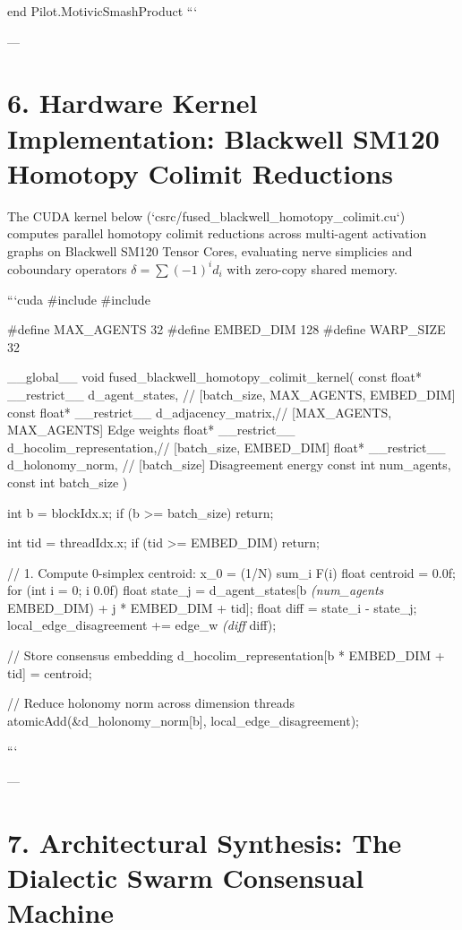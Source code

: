 \documentclass[11pt,twoside,openright]{amsbook}
\begin{document}
{{end Pilot.MotivicSmashProduct
```

---

\section{6. Hardware Kernel Implementation: Blackwell SM120 Homotopy Colimit Reductions}

The CUDA kernel below (`csrc/fused_blackwell_homotopy_colimit.cu`) computes parallel homotopy colimit reductions across multi-agent activation graphs on Blackwell SM120 Tensor Cores, evaluating nerve simplicies and coboundary operators $\delta = \sum (-1)^i d_i$ with zero-copy shared memory.

```cuda
#include 
#include 

#define MAX_AGENTS 32
#define EMBED_DIM 128
#define WARP_SIZE 32

__global__ void fused_blackwell_homotopy_colimit_kernel(
    const float* __restrict__ d_agent_states,    // [batch_size, MAX_AGENTS, EMBED_DIM]
    const float* __restrict__ d_adjacency_matrix,// [MAX_AGENTS, MAX_AGENTS] Edge weights
    float* __restrict__ d_hocolim_representation,// [batch_size, EMBED_DIM]
    float* __restrict__ d_holonomy_norm,         // [batch_size] Disagreement energy
    const int num_agents,
    const int batch_size
) {
    int b = blockIdx.x;
    if (b >= batch_size) return;

    int tid = threadIdx.x;
    if (tid >= EMBED_DIM) return;

    // 1. Compute 0-simplex centroid: x_0 = (1/N) sum_i F(i)
    float centroid = 0.0f;
    for (int i = 0; i  0.0f) {
                float state_j = d_agent_states[b \textit{ (num_agents } EMBED_DIM) + j * EMBED_DIM + tid];
                float diff = state_i - state_j;
                local_edge_disagreement += edge_w \textit{ (diff } diff);
            }
        }
    }

    // Store consensus embedding
    d_hocolim_representation[b * EMBED_DIM + tid] = centroid;

    // Reduce holonomy norm across dimension threads
    atomicAdd(&d_holonomy_norm[b], local_edge_disagreement);
}
```

---

\section{7. Architectural Synthesis: The Dialectic Swarm Consensual Machine}
\end{document}
